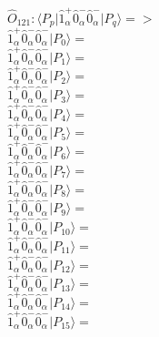 \documentclass[14pt]{article}
\begin{document}
    $\hat{O}_{121}:  \langle{P_p}\vert \hat{1}_{\alpha}^{+}\hat{0}_{\alpha}^{-}\hat{0}_{\alpha}^{-} \vert{P_q}\rangle => $ \\ 
    $ \hat{1}_{\alpha}^{+}\hat{0}_{\alpha}^{-}\hat{0}_{\alpha}^{-} \vert{P_{0}}\rangle =  $ \\ 
    $ \hat{1}_{\alpha}^{+}\hat{0}_{\alpha}^{-}\hat{0}_{\alpha}^{-} \vert{P_{1}}\rangle =  $ \\ 
    $ \hat{1}_{\alpha}^{+}\hat{0}_{\alpha}^{-}\hat{0}_{\alpha}^{-} \vert{P_{2}}\rangle =  $ \\ 
    $ \hat{1}_{\alpha}^{+}\hat{0}_{\alpha}^{-}\hat{0}_{\alpha}^{-} \vert{P_{3}}\rangle =  $ \\ 
    $ \hat{1}_{\alpha}^{+}\hat{0}_{\alpha}^{-}\hat{0}_{\alpha}^{-} \vert{P_{4}}\rangle =  $ \\ 
    $ \hat{1}_{\alpha}^{+}\hat{0}_{\alpha}^{-}\hat{0}_{\alpha}^{-} \vert{P_{5}}\rangle =  $ \\ 
    $ \hat{1}_{\alpha}^{+}\hat{0}_{\alpha}^{-}\hat{0}_{\alpha}^{-} \vert{P_{6}}\rangle =  $ \\ 
    $ \hat{1}_{\alpha}^{+}\hat{0}_{\alpha}^{-}\hat{0}_{\alpha}^{-} \vert{P_{7}}\rangle =  $ \\ 
    $ \hat{1}_{\alpha}^{+}\hat{0}_{\alpha}^{-}\hat{0}_{\alpha}^{-} \vert{P_{8}}\rangle =  $ \\ 
    $ \hat{1}_{\alpha}^{+}\hat{0}_{\alpha}^{-}\hat{0}_{\alpha}^{-} \vert{P_{9}}\rangle =  $ \\ 
    $ \hat{1}_{\alpha}^{+}\hat{0}_{\alpha}^{-}\hat{0}_{\alpha}^{-} \vert{P_{10}}\rangle =  $ \\ 
    $ \hat{1}_{\alpha}^{+}\hat{0}_{\alpha}^{-}\hat{0}_{\alpha}^{-} \vert{P_{11}}\rangle =  $ \\ 
    $ \hat{1}_{\alpha}^{+}\hat{0}_{\alpha}^{-}\hat{0}_{\alpha}^{-} \vert{P_{12}}\rangle =  $ \\ 
    $ \hat{1}_{\alpha}^{+}\hat{0}_{\alpha}^{-}\hat{0}_{\alpha}^{-} \vert{P_{13}}\rangle =  $ \\ 
    $ \hat{1}_{\alpha}^{+}\hat{0}_{\alpha}^{-}\hat{0}_{\alpha}^{-} \vert{P_{14}}\rangle =  $ \\ 
    $ \hat{1}_{\alpha}^{+}\hat{0}_{\alpha}^{-}\hat{0}_{\alpha}^{-} \vert{P_{15}}\rangle =  $ \\ 
    
\end{document}
